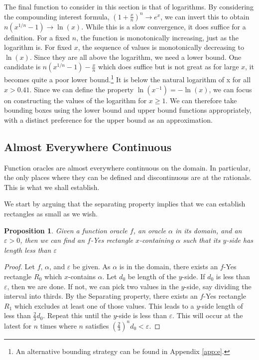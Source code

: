 \documentclass[12pt]{article}
\newtheorem{proposition}{Proposition}
\theoremstyle{remark}
\begin{document}
The final function to consider in this section is that of logarithms. By considering the compounding interest formula, $(1+ \frac{x}{n})^n \to e^x$, we can invert this to obtain $n (x^{1/n} - 1) \to \ln(x)$. While this is a slow convergence, it does suffice for a definition. For a fixed $n$, the function is monotonically increasing, just as the logarithm is. For fixed $x$, the sequence of values is monotonically decreasing to $\ln(x)$. Since they are all above the logarithm, we need a lower bound. One candidate is  $n (x^{1/n} - 1) - \frac{x}{n} $ which does suffice but is not great as for large $x$, it becomes quite a poor lower bound.\footnote{An alternative bounding strategy can be found in Appendix \ref{app:e}.} It is below the natural logarithm of x for all $x > 0.41$. Since we can define the property $\ln(x^{-1}) = - \ln(x)$, we can focus on constructing the values of the logarithm for $x\geq 1$. We can therefore take bounding boxes using the lower bound and upper bound functions appropriately, with a distinct preference for the upper bound as an approximation.  

\subsection{Almost Everywhere Continuous}

Function oracles are almost everywhere continuous on the domain. In particular, the only places where they can be defined and discontinuous are at the rationals. This is what we shall establish. 

We start by arguing that the separating property implies that we can establish rectangles as small as we wish. 

\begin{proposition}\label{pr:fshrink}
Given a function oracle $f$, an oracle $\alpha$ in its domain, and an $\varepsilon > 0$, then we can find an $f$-Yes rectangle $x$-containing $\alpha$ such that its $y$-side has length less than $\varepsilon$
\end{proposition}

\begin{proof}
    Let $f$, $\alpha$, and $\varepsilon$ be given. As $\alpha$ is in the domain, there exists an $f$-Yes rectangle $R_0$ which $x$-contains $\alpha$. Let $d_0$ be length of the $y$-side. If $d_0$ is less than $\varepsilon$, then we are done. If not, we can pick two values in the $y$-side, say dividing the interval into thirds. By the Separating property, there exists an $f$-Yes rectangle $R_1$ which excludes at least one of those values. This leads to a $y$-side length of less than $\frac{2}{3} d_0$. Repeat this until the $y$-side is less than $\varepsilon$. This will occur at the latest for $n$ times where $n$ satisfies $(\frac{2}{3})^n d_0 < \varepsilon$.  
\end{proof}
\end{document}
